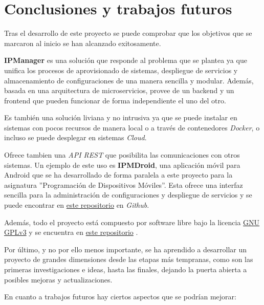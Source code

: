 \chapter{Conclusiones y trabajos futuros}

Tras el desarrollo de este proyecto se puede comprobar que los objetivos que se marcaron al inicio se han alcanzado exitosamente.

\textbf{IPManager} es una solución que responde al problema que se plantea ya que unifica los procesos de aprovisionado de sistemas, despliegue de servicios y almacenamiento de configuraciones de una manera sencilla y modular. Además, basada en una arquitectura de microservicios, provee de un backend y un frontend que pueden funcionar de forma independiente el uno del otro.

Es también una solución liviana y no intrusiva ya que se puede instalar en sistemas con pocos recursos de manera local o a través de contenedores \textit{Docker}, o incluso se puede desplegar en sistemas \textit{Cloud}.

Ofrece tambien una \textit{API REST} que posibilita las comunicaciones con otros sistemas. Un ejemplo de este uso es \textbf{IPMDroid}, una aplicación móvil para Android que se ha desarrollado de forma paralela a este proyecto para la asignatura ''Programación de Dispositivos Móviles''. Esta ofrece una interfaz sencilla para la administración de configuraciones y despliegue de servicios y se puede encontrar en \href{https://github.com/harvestcore/ipmdroid}{este repositorio} \cite{ipmdroid} en \textit{Github}.

Además, todo el proyecto está compuesto por software libre bajo la licencia \href{https://www.gnu.org/licenses/gpl-3.0.html}{GNU GPLv3} y se encuentra en \href{https://github.com/harvestcore/tfg}{este repositorio} \cite{ipmanager}.

Por último, y no por ello menos importante, se ha aprendido a desarrollar un proyecto de grandes dimensiones desde las etapas más tempranas, como son las primeras investigaciones e ideas, hasta las finales, dejando la puerta abierta a posibles mejoras y actualizaciones.


\pagebreak
En cuanto a trabajos futuros hay ciertos aspectos que se podrían mejorar:

